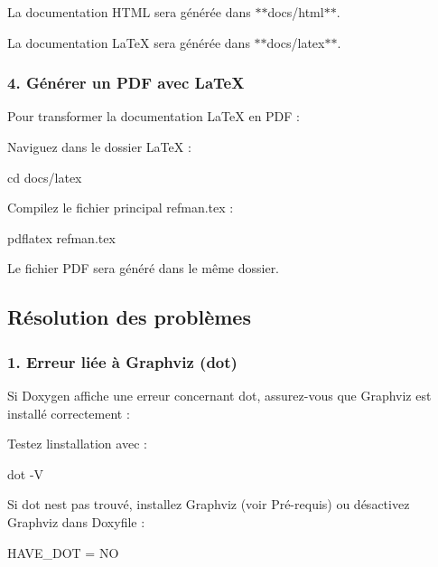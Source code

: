 \begin{DoxyItemize}
\item La documentation H\+T\+ML sera générée dans $\ast$$\ast${\ttfamily docs/html}$\ast$$\ast$.
\item La documentation La\+TeX sera générée dans $\ast$$\ast${\ttfamily docs/latex}$\ast$$\ast$. 


\end{DoxyItemize}

\subsubsection*{4. Générer un P\+DF avec La\+TeX}

Pour transformer la documentation La\+TeX en P\+DF \+:
\begin{DoxyEnumerate}
\item Naviguez dans le dossier La\+TeX \+: 
\begin{DoxyCode}
cd docs/latex
\end{DoxyCode}

\item Compilez le fichier principal {\ttfamily refman.\+tex} \+: 
\begin{DoxyCode}
pdflatex refman.tex
\end{DoxyCode}

\item Le fichier P\+DF sera généré dans le même dossier. 


\end{DoxyEnumerate}

\subsection*{Résolution des problèmes}

\subsubsection*{1. Erreur liée à Graphviz ({\ttfamily dot})}

Si Doxygen affiche une erreur concernant {\ttfamily dot}, assurez-\/vous que Graphviz est installé correctement \+:
\begin{DoxyItemize}
\item Testez l\textquotesingle{}installation avec \+: 
\begin{DoxyCode}
dot -V
\end{DoxyCode}

\item Si {\ttfamily dot} n\textquotesingle{}est pas trouvé, installez Graphviz (voir Pré-\/requis) ou désactivez Graphviz dans {\ttfamily Doxyfile} \+: 
\begin{DoxyCode}
HAVE\_DOT = NO
\end{DoxyCode}

\end{DoxyItemize}

